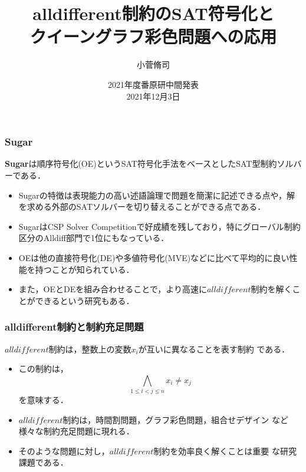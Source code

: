 \documentclass [dvipdfmx,11pt]{beamer}
\title{alldifferent制約のSAT符号化と\\クイーングラフ彩色問題への応用}
\author{小菅脩司}
\institute{番原研究室}
\date{2021年度番原研中間発表\\2021年12月3日}
\newcommand{\alldifferent}{$alldifferent$}
\begin{document}
\begin{frame} {}
    \titlepage
\end{frame}



\begin{frame}
    \frametitle{Sugar}
    \begin{alertblock}{}
        \alert{\bf Sugar}は順序符号化(OE)というSAT符号化手法をベースとしたSAT型制約ソルバーである．
    \end{alertblock}
    \begin{itemize}
        \item Sugarの特徴は表現能力の高い述語論理で問題を簡潔に記述できる点や，解を求める外部のSATソルバーを切り替えることができる点である．
        \item SugarはCSP Solver Competitionで好成績を残しており，特にグローバル制約区分のAlldiff部門で1位にもなっている．
        \item OEは他の直接符号化(DE)や多値符号化(MVE)などに比べて平均的に良い性能を持つことが知られている．
        \item また，OEとDEを組み合わせることで，より高速に{\alldifferent}制約を解くことができるという研究もある．
    \end{itemize}
\end{frame}



\begin{frame}
    \frametitle{alldifferent制約と制約充足問題}
    \begin{alertblock}{}
        {\alldifferent}制約は，整数上の変数$x_{i}$が互いに異なることを表す制約
        である．
    \end{alertblock}
    \begin{itemize}
        \item この制約は，
            $$\bigwedge_{1 \leq i < j \leq n} x_i \neq x_j$$
            を意味する．
        \item {\alldifferent}制約は，時間割問題，グラフ彩色問題，組合せデザイン
            など様々な制約充足問題に現れる．
        \item そのような問題に対し，{\alldifferent}制約を効率良く解くことは重要
            な研究課題である．
    \end{itemize}
\end{frame}
\end{document}
